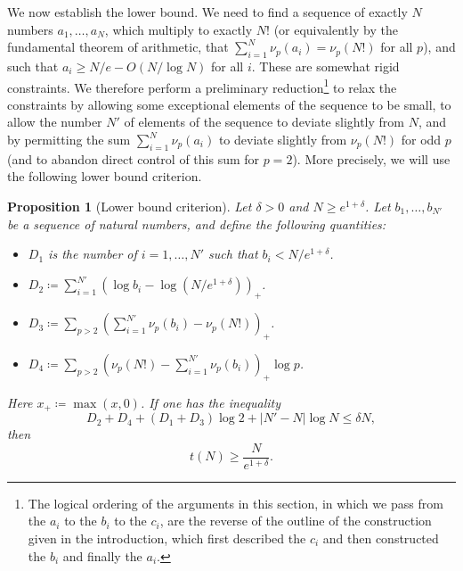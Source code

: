 \documentclass[12pt,a4paper,reqno]{amsart}
\numberwithin{equation}{section}
\theoremstyle{plain}
\newtheorem{proposition}[theorem]{Proposition}
\theoremstyle{definition}
\begin{document}
We now establish the lower bound.  We need to find a sequence of exactly $N$ numbers $a_1,\dots,a_N$, which multiply to exactly $N!$ (or equivalently by the fundamental theorem of arithmetic, that $\sum_{i=1}^N \nu_p(a_i)=  \nu_p(N!)$ for all $p$), and such that $a_i \geq N/e - O(N/\log N)$ for all $i$.  These are somewhat rigid constraints.  We therefore perform a preliminary reduction\footnote{The logical ordering of the arguments in this section, in which we pass from the $a_i$ to the $b_i$ to the $c_i$, are the reverse of the outline of the construction given in the introduction, which first described the $c_i$ and then constructed the $b_i$ and finally the $a_i$.} to relax the constraints by allowing some exceptional elements of the sequence to be small, to allow the number $N'$ of elements of the sequence to deviate slightly from $N$, and by permitting the sum $\sum_{i=1}^N \nu_p(a_i)$ to deviate slightly from $\nu_p(N!)$ for odd $p$ (and to abandon direct control of this sum for $p=2$).  More precisely, we will use the following lower bound criterion.


\begin{proposition}[Lower bound criterion]\label{lower bound} Let $\delta>0$ and $N \geq e^{1+\delta}$. Let $b_1,\dots,b_{N'}$ be a sequence of natural numbers, and define the following quantities:
  \begin{itemize}
    \item[(i)] $D_1$ is the number of $i=1,\dots,N'$ such that $b_i < N / e^{1+\delta}$.
    \item[(ii)] $D_2 \coloneqq \sum_{i=1}^{N'} (\log b_i - \log (N/e^{1+\delta}))_+$.
    \item[(iii)] $D_3 \coloneqq \sum_{p>2} (\sum_{i=1}^{N'} \nu_p(b_i) - \nu_p(N!))_+$.
    \item[(iv)] $D_4 \coloneqq \sum_{p>2} (\nu_p(N!) - \sum_{i=1}^{N'} \nu_p(b_i))_+ \log p$.
  \end{itemize}
Here $x_+ \coloneqq \max(x,0)$.
If one has the inequality
\begin{equation}\label{d24}
   D_2 + D_4 + (D_1 + D_3) \log 2 + |N'-N| \log N \leq \delta N,
\end{equation}
then
$$ t(N) \geq \frac{N}{e^{1+\delta}}.$$
\end{proposition}
\end{document}
